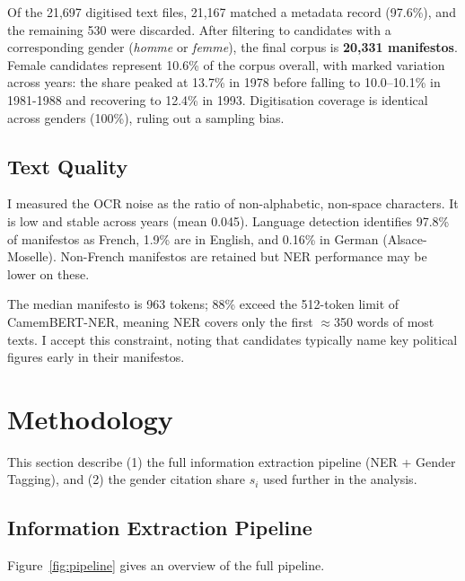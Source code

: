 \documentclass{article}
\begin{document}
Of the 21,697 digitised text files, 21,167 matched a metadata record (97.6\%), and the remaining 530 were discarded. After filtering to candidates with a corresponding gender (\emph{homme} or \emph{femme}), the final corpus is \textbf{20,331 manifestos}. Female candidates represent 10.6\% of the corpus overall, with marked variation across years: the share peaked at 13.7\% in 1978 before falling to 10.0--10.1\% in 1981-1988 and recovering to 12.4\% in 1993. Digitisation coverage is identical across genders (100\%), ruling out a sampling bias.

\subsection{Text Quality}

I measured the OCR noise as the ratio of non-alphabetic, non-space characters. It is low and stable across years (mean 0.045). Language detection identifies 97.8\% of manifestos as French, 1.9\% are in English, and 0.16\% in German (Alsace-Moselle). Non-French manifestos are retained but NER performance may be lower on these.

The median manifesto is 963 tokens; 88\% exceed the 512-token limit of CamemBERT-NER, meaning NER covers only the first $\approx$350 words of most texts. I accept this constraint, noting that candidates typically name key political figures early in their manifestos.


\section{Methodology}

This section describe (1) the full information extraction pipeline (NER + Gender Tagging), and (2) the gender citation share $s_i$ used further in the analysis.

\subsection{Information Extraction Pipeline}

Figure~\ref{fig:pipeline} gives an overview of the full pipeline.
\end{document}
